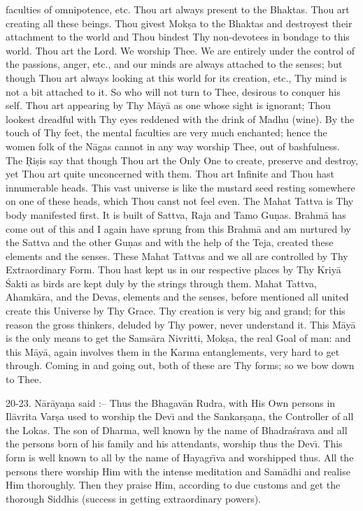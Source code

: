 faculties of omnipotence, etc. Thou art always present to the Bhaktas. Thou art creating all these beings. Thou givest Mok\d{s}a to the Bhaktas and destroyest their attachment to the world and Thou bindest Thy non-devotees in bondage to this world. Thou art the Lord. We worship Thee. We are entirely under the control of the passions, anger, etc., and our minds are always attached to the senses; but though Thou art always looking at this world for its creation, etc., Thy mind is not a bit attached to it. So who will not turn to Thee, desirous to conquer his self. Thou art appearing by Thy M\=ay\=a as one whose sight is ignorant; Thou lookest dreadful with Thy eyes reddened with the drink of Madhu (wine). By the touch of Thy feet, the mental faculties are very much enchanted; hence the women folk of the N\=agas cannot in any way worship Thee, out of bashfulness. The \d{R}i\d{s}is say that though Thou art the Only One to create, preserve and destroy, yet Thou art quite unconcerned with them. Thou art Infinite and Thou hast innumerable heads. This vast universe is like the mustard seed resting somewhere on one of these heads, which Thou canst not feel even. The Mahat Tattva is Thy body manifested first. It is built of Sattva, Raja and Tamo Gu\d{n}as. Brahm\=a has come out of this and I again have sprung from this Brahm\=a and am nurtured by the Sattva and the other Gu\d{n}as and with the help of the Teja, created these elements and the senses. These Mahat Tattvas and we all are controlled by Thy Extraordinary Form. Thou hast kept us in our respective places by Thy Kriy\=a \'Sakti as birds are kept duly by the strings through them. Mahat Tattva, Ahamk\=ara, and the Devas, elements and the senses, before mentioned all united create this Universe by Thy Grace. Thy creation is very big and grand; for this reason the gross thinkers, deluded by Thy power, never understand it. This M\=ay\=a is the only means to get the Sams\=ara Nivritti, Mok\d{s}a, the real Goal of man: and this M\=ay\=a, again involves them in the Karma entanglements, very hard to get through. Coming in and going out, both of these are Thy forms; so we bow down to Thee.

20-23. N\=ar\=aya\d{n}a said :-- Thus the Bhagav\=an Rudra, with His Own persons in Il\=avrita Var\d{s}a used to worship the Dev\={\i} and the Sankar\d{s}a\d{n}a, the Controller of all the Lokas. The son of Dharma, well known by the name of Bhadra\'srava and all the persons born of his family and his attendants, worship thus the Dev\={\i}. This form is well known to all by the name of Hayagr\={\i}va and worshipped thus. All the persons there worship Him with the intense meditation and Sam\=adhi and realise Him thoroughly. Then they praise Him, according to due customs and get the thorough Siddhis (success in getting extraordinary powers).

